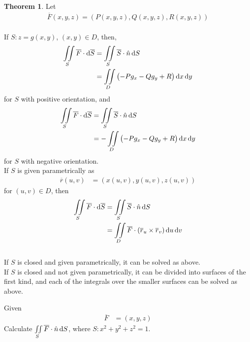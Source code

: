 \documentclass[fleqn, a4paper, 12pt, twoside]{article}
\theoremstyle{definition}
\theoremstyle{theorem}
\newtheorem{theorem}{Theorem}
\begin{document}
{\begin{theorem}
	Let
	\begin{align*}
		\overline{F}(x,y,z) = \left( P(x,y,z) , Q(x,y,z) , R(x,y,z) \right)
	\end{align*}
	~\\
	If $S : z = g(x,y)$, $(x,y) \in D$, then,
	\begin{align*}
		\iint\limits_{S} \overline{F} \cdot \dif \overline{S} & = \iint\limits_{S} \overline{S} \cdot \hat{n} \dif S \\
                                                                      & = \iint\limits_{D} \left( -P g_x - Q g_y + R \right) \dif x \dif y
	\end{align*}
	for $S$ with positive orientation, and
	\begin{align*}
		\iint\limits_{S} \overline{F} \cdot \dif \overline{S} & = \iint\limits_{S} \overline{S} \cdot \hat{n} \dif S \\
                                                                      & = -\iint\limits_{D} \left( -P g_x - Q g_y + R \right) \dif x \dif y
	\end{align*}
	for $S$ with negative orientation.
	~\\
	If $S$ is given parametrically as
	\begin{align*}
		\overline{r}(u,v) & = \left( x(u,v) , y(u,v) , z(u,v) \right)
	\end{align*}
	for $(u,v) \in D$, then
	\begin{align*}
		\iint\limits_{S} \overline{F} \cdot \dif \overline{S} & = \iint\limits_{S} \overline{S} \cdot \hat{n} \dif S \\
                                                                      & = \iint\limits_{D} \overline{F} \cdot \left( \overline{r}_u \times \overline{r}_v \right) \dif u \dif v
	\end{align*}
	~\\
	If $S$ is closed and given parametrically, it can be solved as above.\\
	If $S$ is closed and not given parametrically, it can be divided into surfaces of the first kind, and each of the integrals over the smaller surfaces can be solved as above.
\end{theorem}

\begin{question}
	Given
	\begin{align*}
		\overline{F} & = (x,y,z)
	\end{align*}
	Calculate $\iint\limits_{S} \overline{F} \cdot \hat{n} \dif S$, where $S : x^2 + y^2 + z^2 = 1$.
\end{question}

}
\end{document}
